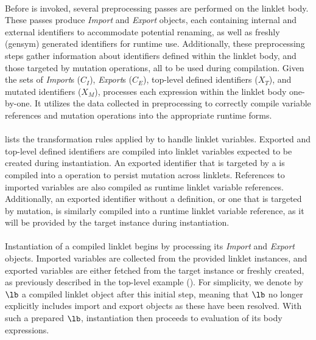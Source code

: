 		\paragraph{}%
			Before  is invoked, several preprocessing passes are performed on the linklet body. These passes produce \emph{Import} and \emph{Export} objects, each containing internal and external identifiers to accommodate potential renaming, as well as freshly (gensym) generated identifiers for runtime use. Additionally, these preprocessing steps gather information about identifiers defined within the linklet body, and those targeted by mutation operations, all to be used during compilation. Given the sets of \emph{Import}s ($\mathit{C_I}$), \emph{Export}s ($\mathit{C_E}$), top-level defined identifiers ($\mathit{X_T}$), and mutated identifiers ($\mathit{X_M}$),  processes each expression within the linklet body one-by-one. It utilizes the data collected in preprocessing to correctly compile variable references and mutation operations into the appropriate runtime forms.


		\paragraph{}%
			 lists the transformation rules applied by  to handle linklet variables. Exported and top-level defined identifiers are compiled into linklet variables expected to be created during instantiation. An exported identifier that is targeted by a  is compiled into a  operation to persist mutation across linklets. References to imported variables are also compiled as runtime linklet variable references. Additionally, an exported identifier without a definition, or one that is targeted by mutation, is similarly compiled into a runtime linklet variable reference, as it will be provided by the target instance during instantiation.

		\paragraph{}%
			Instantiation of a compiled linklet begins by processing its \emph{Import} and \emph{Export} objects. Imported variables are collected from the provided linklet instances, and exported variables are either fetched from the target instance or freshly created, as previously described in the top-level example (). For simplicity, we denote by $\lb$ a compiled linklet object after this initial step, meaning that $\lb$ no longer explicitly includes import and export objects as these have been resolved. With such a prepared $\lb$, instantiation then proceeds to evaluation of its body expressions.

